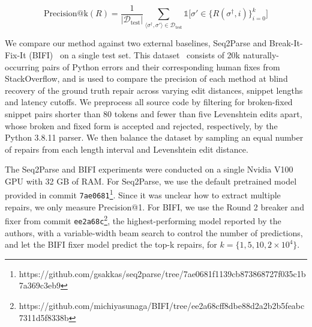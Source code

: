 \documentclass[runningheads]{llncs}
\begin{document}
\begin{equation}
  \text{Precision@k}(R) = \frac{1}{|\mathcal{D}_{\text{test}}|}\sum_{\langle\sigma^\dagger, \sigma'\rangle \in \mathcal{D}_{\text{test}}} \mathds{1}\Big[\sigma' \in \big\{R(\sigma^\dagger, i)\big\}_{i=0}^k\Big]
\end{equation}



We compare our method against two external baselines, Seq2Parse and Break-It-Fix-It (BIFI)~\cite{yasunaga2021break} on a single test set. This dataset~\cite{wong2019syntax} consists of 20k naturally-occurring pairs of Python errors and their corresponding human fixes from StackOverflow, and is used to compare the precision of each method at blind recovery of the ground truth repair across varying edit distances, snippet lengths and latency cutoffs. We preprocess all source code by filtering for broken-fixed snippet pairs shorter than 80 tokens and fewer than five Levenshtein edits apart, whose broken and fixed form is accepted and rejected, respectively, by the Python 3.8.11 parser. We then balance the dataset by sampling an equal number of repairs from each length interval and Levenshtein edit distance.


The Seq2Parse and BIFI experiments were conducted on a single Nvidia V100 GPU with 32 GB of RAM. For Seq2Parse, we use the default pretrained model provided in commit \texttt{7ae0681}\footnote{\scriptsize{https://github.com/gsakkas/seq2parse/tree/7ae0681f1139cb873868727f035c1b7a369c3eb9}}. Since it was unclear how to extract multiple repairs, we only measure Precision@1. For BIFI, we use the Round 2 breaker and fixer from commit \texttt{ee2a68c}\footnote{\scriptsize{https://github.com/michiyasunaga/BIFI/tree/ee2a68cff8dbe88d2a2b2b5feabc7311d5f8338b}}, the highest-performing model reported by the authors, with a variable-width beam search to control the number of predictions, and let the BIFI fixer model predict the top-k repairs, for $k=\{1, 5, 10, 2\times10^4\}$.
\end{document}
